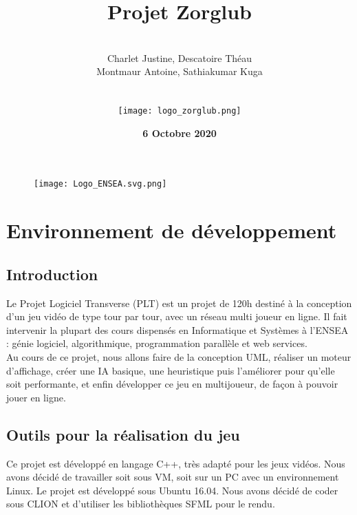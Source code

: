 \documentclass[a4paper,12pt]{report}
\begin{document}
	\begin{figure}
		\texttt{[image: Logo\_ENSEA.svg.png]}
	\end{figure}

	
	\title{\textbf{Projet Zorglub}}
	\author{\hline \\ Charlet Justine, Descatoire Théau \\ Montmaur Antoine,  Sathiakumar Kuga \\ \\ \hline \\  \texttt{[image: logo\_zorglub.png]} }
	\date{\textbf{6 Octobre 2020}}

	

	
	
	\maketitle
	\tableofcontents
	
	
	\chapter{Environnement de développement}
	\section{Introduction}
	Le Projet Logiciel Transverse (PLT) est un projet de 120h destiné à la conception d'un jeu vidéo de type tour par tour, avec un réseau multi joueur en ligne. Il fait intervenir la plupart des cours dispensés en Informatique et Systèmes à l'ENSEA : génie logiciel, algorithmique, programmation parallèle et web services. \\
	\indent Au cours de ce projet, nous allons faire de la conception UML, réaliser un moteur d'affichage, créer une IA basique, une heuristique puis l'améliorer pour qu'elle soit performante, et enfin développer ce jeu en multijoueur, de façon à pouvoir jouer en ligne.


	
	\section{Outils pour la réalisation du jeu}
	
		Ce projet est développé en langage C++, très adapté pour les jeux vidéos. Nous avons décidé de travailler soit sous VM, soit sur un PC avec un environnement Linux. Le projet est développé sous Ubuntu 16.04. Nous avons décidé de coder sous CLION et d'utiliser les bibliothèques SFML pour le rendu. \\ \\
\end{document}
